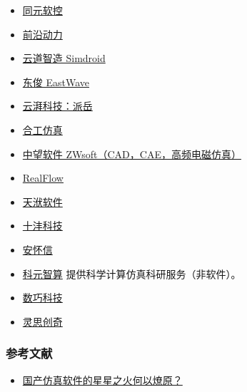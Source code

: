 

\begin{issues}
\issueDraft
\end{issues}

\begin{itemize}
\item \href{https://www.tongyuan.cc/}{同元软控}
\item \href{http://www.adicn.com/}{前沿动力}
\item \href{https://www.ibe.cn/}{云道智造 Simdroid}
\item \href{https://www.eastfdtd.com/index.aspx}{东俊 EastWave}
\item \href{https://www.yunpaikeji.com.cn/cpfw}{云湃科技：派岳}
\item \href{http://www.uninsim.com/}{合工仿真}
\item \href{https://www.zwsoft.cn/product/cae/waves}{中望软件 ZWsoft（CAD，CAE，高频电磁仿真）}
\item \href{https://www.realflow.com.cn/}{RealFlow}
\item \href{https://www.njtf.cn/}{天洑软件}
\item \href{https://www.tenfong.cn/}{十沣科技}
\item \href{http://www.anwiseglobal.cn/}{安怀信}
\item \href{https://www.keyuanzhisuan.com/}{科元智算} 提供科学计算仿真科研服务（非软件）。
\item \href{https://www.simright.com/zh/}{数巧科技}
\item \href{http://www.linkstech.com.cn/}{灵思创奇}
\end{itemize}

\subsubsection{参考文献}
\begin{itemize}
\item \href{https://m.e-works.net.cn/articles/article151824.htm}{国产仿真软件的星星之火何以燎原？}
\end{itemize}
